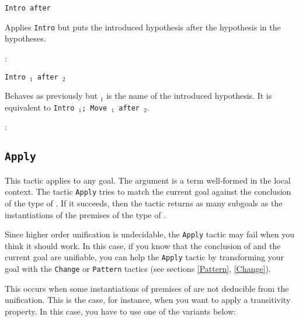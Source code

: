 \begin{Variants}
\item {\tt Intro after \ident} 

  Applies {\tt Intro} but puts the introduced
  hypothesis after the hypothesis \ident{} in the hypotheses.

\begin{ErrMsgs}
\item {}
\item {} : {\ident}
\end{ErrMsgs}

\item {\tt Intro \ident$_1$ after \ident$_2$}
  
  Behaves as previously but \ident$_1$ is the name of the introduced
  hypothesis.  It is equivalent to {\tt Intro \ident$_1$; Move
    \ident$_1$ after \ident$_2$}.

\begin{ErrMsgs}
\item {}
\item {} : {\ident}
\end{ErrMsgs}

\end{Variants}

\subsection{\tt Apply \term}
\label{Apply}

This tactic applies to any goal.  The argument {\term} is a term
well-formed in the local context.  The tactic {\tt Apply} tries to
match the current goal against the conclusion of the type of {\term}.
If it succeeds, then the tactic returns as many subgoals as the
instantiations of the premises of the type of {\term}.

\begin{ErrMsgs}
\item {} 

  Since higher order unification is undecidable, the {\tt Apply}
  tactic may fail when you think it should work.  In this case, if you
  know that the conclusion of {\term} and the current goal are
  unifiable, you can help the {\tt Apply} tactic by transforming your
  goal with the {\tt Change} or {\tt Pattern} tactics (see sections
  \ref{Pattern}, \ref{Change}).

\item {}

  This occurs when some instantiations of premises of {\term} are not
  deducible from the unification. This is the case, for instance, when
  you want to apply a transitivity property. In this case, you have to
  use one of the variants below:

\end{ErrMsgs}

